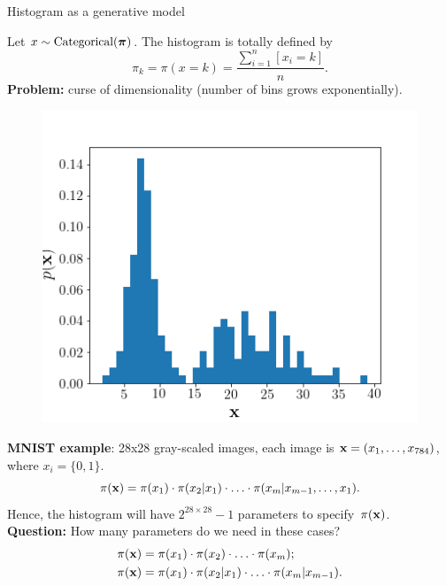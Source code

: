 \begin{frame}{Histogram as a generative model}
	
	\begin{minipage}[t]{0.6\columnwidth}
	    Let $x \sim \text{Categorical}(\boldsymbol{\pi})$. The histogram is totally defined by
		\[
		    \pi_k = \pi(x = k) = \frac{\sum_{i=1}^n [x_i = k]}{n}.
		\]
		\textbf{Problem:} curse of dimensionality (number of bins grows exponentially). \\
		\end{minipage}%
		\begin{minipage}[t]{0.4\columnwidth}
	    \begin{figure}[h]
	        \centering
	        \includegraphics[width=\linewidth]{figs/histogram.png}
	    \end{figure}
	\end{minipage}
	\textbf{MNIST example}: 28x28 gray-scaled images, each image is $\mathbf{x} = (x_1, \dots, x_{784})$, where $x_i = \{0, 1\}$. 
	\[
	    \pi(\mathbf{x}) = \pi(x_1) \cdot \pi(x_2 | x_1) \cdot \ldots \cdot \pi(x_m | x_{m-1}, \dots, x_1).
	\]
	Hence, the histogram will have $2^{28 \times 28} - 1$ parameters to specify~$\pi(\mathbf{x})$. \\
	\textbf{Question:} How many parameters do we need in these cases?
	\begin{align*}
	    \pi(\mathbf{x}) &= \pi(x_1) \cdot \pi(x_2)\cdot \ldots \cdot \pi(x_m); \\
	    \pi(\mathbf{x}) &= \pi(x_1) \cdot \pi(x_2 | x_1) \cdot \ldots \cdot \pi(x_m | x_{m-1}).
	\end{align*}
\end{frame}
